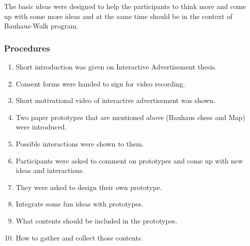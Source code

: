 The basic ideas were designed to help the participants to think more and come up with some more ideas and at the same time should be in the context of Bauhaus-Walk program.

\subsubsection{Procedures}
\begin{enumerate}
\item   Short introduction was given on Interactive Advertisement thesis.
\item   Consent forms were handed to sign for video recording.
\item	Short motivational video of interactive advertisement was shown.
\item	Two paper prototypes that are mentioned above (Bauhaus chess and Map) were introduced.
\item	Possible interactions were shown to them.
\item	Participants were asked to comment on prototypes and come up with new ideas and interactions.
\item	They were asked to design their own prototype.
\item	Integrate some fun ideas with prototypes.
\item	What contents should be included in the prototypes.
\item	How to gather and collect those contents.
\end{enumerate}

